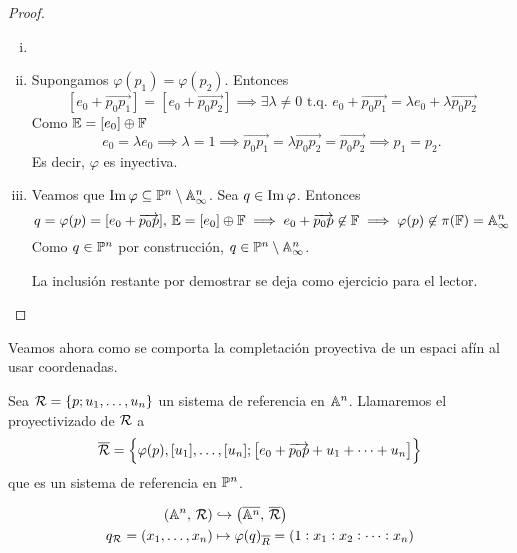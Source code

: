 \begin{proof}
  \begin{enumerate}[i)]
    \item[]
    \item Supongamos $\varphi(p_1) = \varphi(p_2)$. Entonces
    \[
      [e_0 + \overrightarrow{p_0p_1}] = [e_0+\overrightarrow{p_0p_2}]
      \implies \exists \lambda \neq 0 \text{ t.q. } e_0 + \overrightarrow{p_0p_1}
      = \lambda e_0 + \lambda \overrightarrow{p_0p_2}
    \]
    Como $\mathbb{E} = [e_0] \oplus \mathbb{F}$
    \[e_0 = \lambda e_0 \implies \lambda = 1 \implies \overrightarrow{p_0p_1}
    = \lambda \overrightarrow{p_0p_2} = \overrightarrow{p_0p_2} \implies
    p_1 = p_2.\]
    Es decir, $\varphi$ es inyectiva.
    \item Veamos que $\operatorname{Im} \varphi \subseteq \mathbb{P}^n \setminus \mathbb{A}^n_\infty$. Sea
    $q \in \operatorname{Im} \varphi$. Entonces
    \[
      q = \varphi(p) = [e_0+\overrightarrow{p_0p}], \, \mathbb{E} = [e_0] \oplus \mathbb{F}
      \implies e_0 + \overrightarrow{p_0p} \not \in \mathbb{F} \implies
      \varphi(p) \not \in \pi(\mathbb{F}) = \mathbb{A}^n_\infty
    \]
    Como $q \in \mathbb{P}^n$ por construcción, $q \in \mathbb{P}^n \setminus \mathbb{A}^n_\infty$.
    
    La inclusión restante por demostrar se deja como ejercicio para el lector.
  \end{enumerate}
\end{proof}

Veamos ahora como se comporta la completación proyectiva de un espaci afín
al usar coordenadas.

\begin{defi}
  Sea $\mathcal{R} = \left \{p;u_1, \dots, u_n \right \}$ un sistema de referencia en
  $\mathbb{A}^n$. Llamaremos el proyectivizado de $\mathcal{R}$ a
  \[
    \overline{\mathcal{R}} = \left \{ \varphi(p), [u_1], \dots, [u_n] ; 
    \left[ e_0 + \overrightarrow{p_0p} + u_1 + \dots + u_n \right] \right \}
  \]
  que es un sistema de referencia en $\mathbb{P}^n$.
\end{defi}

\begin{prop}  
  \[
    \begin{aligned}
      \left( \mathbb{A}^n, \, \mathcal{R} \right) &\hookrightarrow \bigl( \overline{\mathbb{A}^n}, \, \overline{\mathcal{R}} 
      \bigr) \\
      q_{\mathcal{R}} = \left( x_1, \dots, x_n \right) &\mapsto \varphi(q)_{\overline{R}} = \left(
      1 : x_1 : x_2 : \dots : x_n \right)
    \end{aligned}  
  \]
\end{prop}

